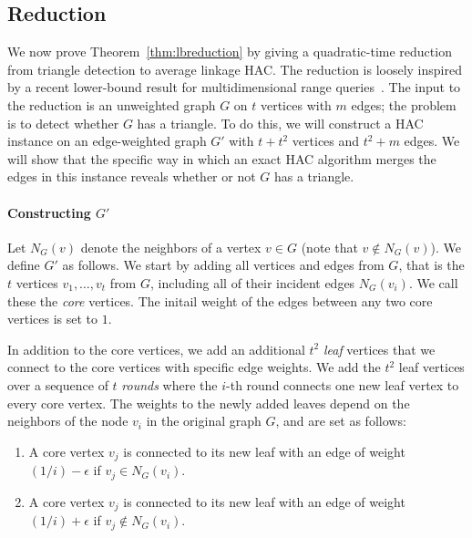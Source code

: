 \documentclass[11pt]{article}
\begin{document}
\subsection{Reduction}
We now prove Theorem~\ref{thm:lbreduction} by
giving a quadratic-time reduction from triangle detection to average linkage HAC.
The reduction is loosely inspired by a recent lower-bound result for multidimensional range queries~\cite{lau2021algorithms}.
The input to the reduction is an unweighted graph $G$ on $t$ vertices with $m$ edges; the problem is to detect whether $G$ has a triangle.
To do this, we will construct a HAC instance on an edge-weighted graph $G'$ with $t + t^2$ vertices and $t^2 + m$ edges. 
We will show that the specific way in which an exact HAC algorithm merges the edges in this instance reveals whether or not $G$ has a triangle.

\paragraph{Constructing $G'$}
Let $N_{G}(v)$ denote the neighbors of a vertex $v \in G$ (note that $v \notin N_{G}(v)$).
We define $G'$ as follows. 
We start by adding all vertices and edges from $G$, that is the $t$ vertices $v_1, \ldots, v_t$ from $G$, including all of their incident edges $N_{G}(v_i)$.
We call these the {\em core} vertices. 
The initail weight of the edges between any two core vertices is set to $1$.

In addition to the core vertices, we add an additional $t^2$ {\em leaf} vertices that we connect to the core vertices with specific edge weights.
We add the $t^2$ leaf vertices over a sequence of $t$ {\em rounds} where the $i$-th round connects one new leaf vertex to every core vertex.
The weights to the newly added leaves depend on the neighbors of the node $v_i$ in the original graph $G$, and are set as follows:
\begin{enumerate}[label=(\textbf{\arabic*})]
\item A core vertex $v_j$ is connected to its new leaf with an edge of weight $(1/i) - \epsilon$ if $v_j \in N_{G}(v_i)$.\label{typeone}
\item A core vertex $v_j$ is connected to its new leaf with an edge of weight $(1/i) + \epsilon$ if $v_j \notin N_{G}(v_i)$.\label{typetwo}
\end{enumerate}
\end{document}

